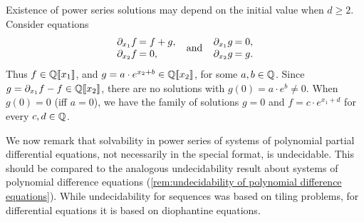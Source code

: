 \begin{example}
    \label{rem:not uniformably solvable}
    Existence of power series solutions
    may depend on the initial value when $d \geq 2$.
    Consider equations
    \begin{align*}
        \arraycolsep=1pt
        \begin{array}{rl}
            \partial {x_1} f &= f+g, \\
            \partial {x_2} f &= 0,
        \end{array}
        \quad \text{and} \quad
        \begin{array}{rl}
            \partial {x_1} g &= 0, \\
            \partial {x_2} g &= g.
        \end{array}
    \end{align*}
    Thus $f \in \mathbb Q[\![x_1]\!]$,
    and $g = a \cdot e^{x_2 + b} \in \mathbb Q[\![x_2]\!]$, for some $a, b \in \mathbb Q$.
    Since $g = \partial {x_1} f - f \in \powerseries \Q {x_2}$,
    there are no solutions with $g(0) = a \cdot e^b \neq 0$.
    When $g(0) = 0$ (iff $a = 0$), we have the family of solutions
    $g = 0$ and $f = c \cdot e^{{x_1}+d}$ for every $c, d \in \mathbb Q$.
\end{example}

We now remark that solvability in power series of systems of polynomial partial differential equations,
not necessarily in the special \CDA{} format, is undecidable.
%
This should be compared to the analogous undecidability result about systems of polynomial difference equations
(\cref{rem:undecidability of polynomial difference equations}).
%
While undecidability for sequences was based on tiling problems,
for differential equations it is based on diophantine equations.

